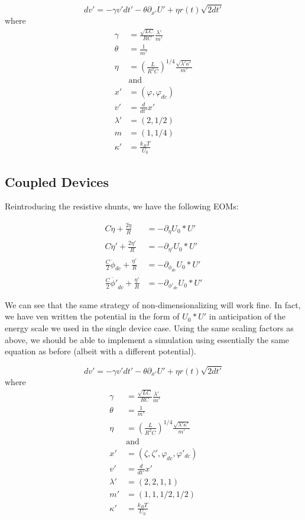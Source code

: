 \documentclass[paper=a4, twocolumn, fontsize=10pt]{article} %
\numberwithin{equation}{section} %
\numberwithin{figure}{section} %
\numberwithin{table}{section} %
\begin{document}
 \[ dv' = -\gamma v' dt' - \theta \partial_{x'} U' + \eta r(t) \sqrt{2dt'} \]
where
\begin{align*}
    \gamma &=  \frac{\sqrt{LC} }{ RC} \frac{\lambda'}{m'}  \\
    \theta &= \frac{1 }{ m'} \\
    \eta &= \left(  \frac{L}{R^2 C} \right)^{1/4} \frac{\sqrt{\lambda'\kappa'}}{m'} \\
    &\text{and} \\
    x' &= (\varphi, \varphi_{dc}) \\
    v' &= \frac{d}{dt'} x' \\
    \lambda' &= (2, 1/2) \\
    m &= ( 1, 1/4) \\
    \kappa' &= \frac{k_B T}{U_0}
\end{align*}

\subsection{Coupled Devices}

Reintroducing the resistive shunts, we have the following EOMs:

\begin{align*}
    C \ddot{\eta} + \frac{2 \dot{\eta}}{R} &= -\partial_{\eta} U_0 * U' \\
    C \ddot{\eta}' + \frac{2 \dot{\eta'}}{R}  &= -\partial_{\eta'} U_0 * U' \\
\frac{C}{2} \ddot{\phi}_{dc} + \frac{\dot{\eta'}}{R} &= -\partial_{\phi_{dc}} U_0 * U' \\
\frac{C}{2} \ddot{\phi'}_{dc} + \frac{\dot{\eta'}}{R} &= -\partial_{\phi'_{dc}} U_0 * U'
\end{align*}

We can see that the same strategy of non-dimensionalizing will work fine. In fact, we have ven written the potential in the form of $U_0 * U'$ in anticipation of the energy scale we used in the single device case. Using the same scaling factors as above, we should be able to implement a simulation using essentially the same equation as before (albeit with a different potential).

\[ dv' = -\gamma v' dt' - \theta \partial_{x'} U' + \eta r(t) \sqrt{2dt'} \]
where
\begin{align*}
    \gamma &=  \frac{\sqrt{LC} }{ RC} \frac{\lambda'}{m'}  \\
    \theta &= \frac{1 }{ m'} \\
    \eta &= \left(  \frac{L}{R^2 C} \right)^{1/4} \frac{\sqrt{\lambda'\kappa'}}{m'} \\
    &\text{and} \\
    x' &= (\zeta, \zeta', \varphi_{dc}, \varphi'_{dc}) \\
    v' &= \frac{d}{dt'} x' \\
    \lambda' &= (2, 2, 1, 1) \\
    m' &= ( 1, 1, 1/2, 1/2) \\
    \kappa' &= \frac{k_B T}{U_0}
\end{align*}
\end{document}
